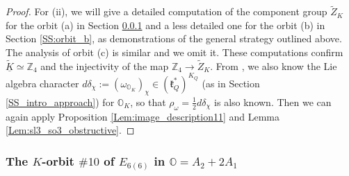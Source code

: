 \documentclass[12pt]{amsart}
\newcommand{\C}{\mathbb{C}}
\newcommand{\A}{\mathcal{A}}
\newcommand{\g}{\mathfrak{g}}
\newcommand{\Orb}{\mathbb{O}}
\newcommand{\Z}{\mathbb{Z}}
\newcommand{\kf}{\mathfrak{k}}
\newcommand{\HC}{\operatorname{HC}}
\newcommand{\spec}{\operatorname{Spec}}
\newtheorem{Prop}[Thm]{Proposition}
\newtheorem{Cor}[Thm]{Corollary}
\theoremstyle{definition}
\numberwithin{equation}{section}
\begin{document}
\begin{proof}
	For (ii), we will give a detailed computation of the component group $\tilde{Z}_K$ for the orbit (a) in Section \ref{SS:orbit_a} and a less detailed one for the orbit (b) in Section \ref{SS:orbit_b}, as demonstrations of the general strategy outlined above. The analysis of orbit (c) is similar and we omit it. These computations confirm $\underline{\tilde{K}} \simeq \Z_4$ and the injectivity of the map $\Z_4 \to \tilde{Z}_K$. From \cite{Noel1, Noel2}, we also know the Lie algebra character $d \delta_\chi := (\omega_{\Orb_K})_\chi \in (\kf_Q^*)^{K_Q}$ (as in Section \ref{SS_intro_approach}) for $\Orb_K$, so that $\rho_\omega = \frac{1}{2} d \delta_\chi$ is also known. Then we can again apply Proposition \ref{Lem:image_description11} and Lemma \ref{Lem:sl3_so3_obstructive}.
\end{proof}

	
	
\subsubsection{The $K$-orbit $\# 10$ of $E_{6(6)}$ in $\Orb = A_2 + 2A_1$}\label{SS:orbit_a} \, \\
\end{document}
